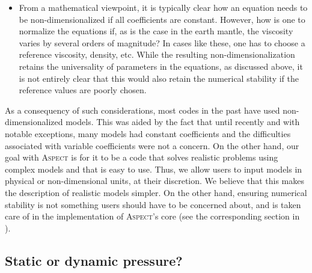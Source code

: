 \documentclass{article}
\newcommand{\aspect}{\textsc{Aspect}}
\begin{document}
\begin{itemize}
  \item From a mathematical viewpoint, it is typically clear how an equation
  needs to be non-dimensionalized if all coefficients are constant. However, how
  is one to normalize the equations if, as is the case in the earth mantle, the
  viscosity varies by several orders of magnitude? In cases like these, one has
  to choose a reference viscosity, density, etc. While the resulting
  non-dimensionalization retains the universality of parameters in the
  equations, as discussed above, it is not entirely clear that this would also
  retain the numerical stability if the reference values are poorly chosen.
\end{itemize}

As a consequency of such considerations, most codes in the past have used
non-dimensionalized models. This was aided by the fact that until recently and
with notable exceptions, many models had constant coefficients and the
difficulties associated with variable coefficients were not a concern. On the
other hand, our goal with \aspect{} is for it to be a code that solves realistic
problems using complex models and that is easy to use. Thus, we allow users to
input models in physical or non-dimensional units, at their discretion. We
believe that this makes the description of realistic models simpler. On
the other hand, ensuring numerical stability is not something users should have
to be concerned about, and is taken care of in the implementation of \aspect{}'s
core (see the corresponding section in \cite{KHB12}).



\subsection{Static or dynamic pressure?}
\label{sec:pressure-static-dyn}
\end{document}
